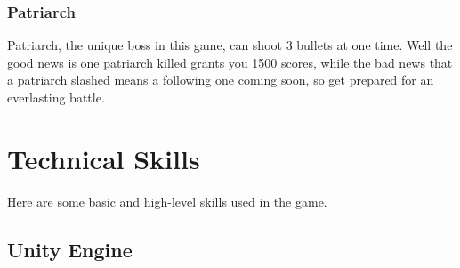 \documentclass{article}
\begin{document}
\subsubsection{Patriarch}
Patriarch, the unique boss in this game, can shoot 3 bullets at one time. Well the good news is one patriarch killed grants you 1500 scores, while the bad news that a patriarch slashed means a following one coming soon, so get prepared for an everlasting battle.



\section{Technical Skills}
Here are some basic and high-level skills used in the game.
\subsection{Unity Engine}
\end{document}
